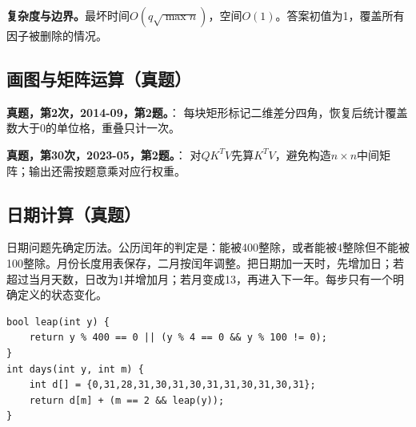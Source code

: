 \noindent\textbf{复杂度与边界。}最坏时间$O(q\sqrt{\max n})$，空间$O(1)$。答案初值为1，覆盖所有因子被删除的情况。

\subsection{画图与矩阵运算（真题）}
\textbf{真题，第2次，2014-09，第2题。}：
每块矩形标记二维差分四角，恢复后统计覆盖数大于0的单位格，重叠只计一次。

\textbf{真题，第30次，2023-05，第2题。}：
对$QK^TV$先算$K^TV$，避免构造$n\times n$中间矩阵；输出还需按题意乘对应行权重。
\subsection{日期计算（真题）}
日期问题先确定历法。公历闰年的判定是：能被400整除，或者能被4整除但不能被100整除。月份长度用表保存，二月按闰年调整。把日期加一天时，先增加日；若超过当月天数，日改为1并增加月；若月变成13，再进入下一年。每步只有一个明确定义的状态变化。

\begin{lstlisting}
bool leap(int y) {
    return y % 400 == 0 || (y % 4 == 0 && y % 100 != 0);
}
int days(int y, int m) {
    int d[] = {0,31,28,31,30,31,30,31,31,30,31,30,31};
    return d[m] + (m == 2 && leap(y));
}
\end{lstlisting}
